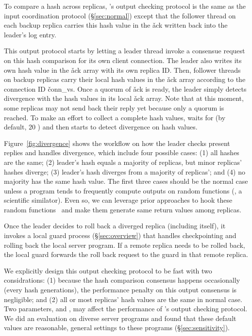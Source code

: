 To compare a hash across replicas, \xxx's output checking protocol is the same 
as the input coordination protocol (\S\ref{sec:normal}) except that the 
follower thread on each backup replica carries this hash value in the \v{ack} 
written back into the leader's log entry.

This output protocol starts by letting a leader thread invoke a consensue 
request on this hash comparison for its own client connection. The leader also 
writes its own hash value in the \v{ack} array with its own replica ID. Then, 
follower threads on backup replicas carry their local hash values in the \v{ack} 
array according to the connection ID \v{conn\_vs}. Once a quorum of \v{ack} 
is ready, the leader simply detects divergence with the hash values in its 
local \v{ack} array. Note that at this moment, some replicas may not send back 
their reply yet because only a quorum is reached. To make an effort to collect 
a complete hash values, \xxx waits for \twait (by default, 20 \us) and then 
starts to detect divergence on hash values.

Figure~\ref{fig:divergence} shows the workflow on how the leader checks 
present replies and handles divergence, which include four possible cases: 
(1) all hashes are the same; (2) leader's hash equals a majority of replicas, 
but minor replicas' hashes diverge; (3) leader's hash diverges from a majority 
of replicas'; and (4) no majority has the same hash value. The first three 
cases should be the normal case unless a program tends to frequently compute 
outputs on random functions (\eg, a scientific similator). Even so, we can 
leverage prior approaches to hook these 
random functions~\cite{paxos:practical,eve:osdi12} and make them generate same 
return values among replicas.

Once the leader decides to roll back a diverged replica (including itself), it 
invokes a local guard process (\S\ref{sec:overview}) that handles 
checkpointing and rolling back the local server program. If a remote replica 
needs to be rolled back, the local guard forwards the roll back request to the 
guard in that remote replica.

We explicitly design this output checking protocol to be fast with two 
considrations: (1) because the hash comparison consensus happens occasionally 
(every \thashcomp hash generations), the performance penalty on this output 
consensus is negligible; and (2) all or most replicas' hash values are 
the same in normal case. Two parameters, \thashcomp and \twait, may affect the 
performance of \xxx's output checking protocol. We did an evaluation on 
diverse server programs and found that these default values are reasonable, 
general settings to these programs (\S\ref{sec:sensitivity}).

